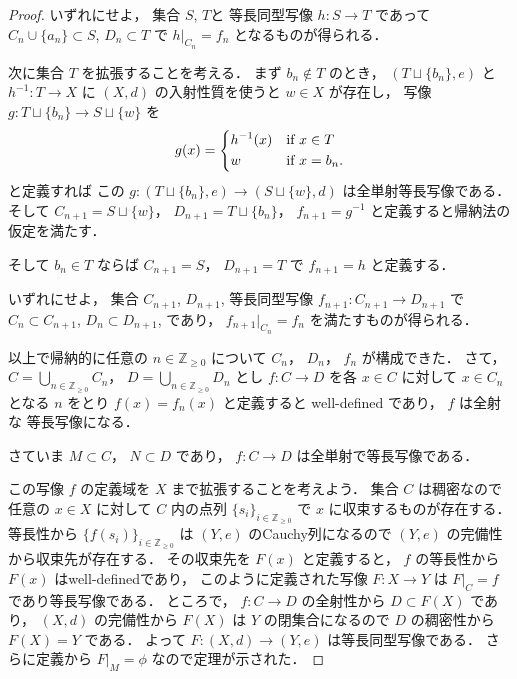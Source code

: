 \documentclass[leqno, 12pt]{jsarticle}
\newcommand{\zz}{\mathbb{Z}}
\newcommand{\yozz}[1]{\zz_{\ge #1}}
\newcommand{\restr}[2]{#1|_{#2}}
\begin{document}
\begin{proof}
いずれにせよ，
集合
$S$, 
$T$と
等長同型写像
$h\colon S\to T$
であって
$C_{n}\cup \{a_{n}\}\subset S$, 
$D_{n}\subset T$
で
$\restr{h}{C_{n}}=f_{n}$
となるものが得られる．



次に集合
$T$
を拡張することを考える．
まず
$b_{n}\not\in T$%
のとき，
$(T\sqcup\{b_{n}\}, e)$
と
$h^{-1}\colon  T\to X$%
に
$(X, d)$
の入射性質を使うと
$w\in X$
が存在し，
写像
$g\colon  T\sqcup\{b_{n}\}\to S\sqcup\{w\}$%
を
\[
g(x)=
\begin{dcases}
	h^{-1}(x) & \text{if
$x\in T$%
}\\
	w & \text{if
$x=b_{n}$%
}.
\end{dcases}
\]
と定義すれば
この
$g\colon  (T\sqcup \{b_{n}\}, e)\to (S\sqcup\{w\}, d)$
は全単射等長写像である．
そして
$C_{n+1}=S\sqcup \{w\}$，
$D_{n+1}=T\sqcup \{b_{n}\}$，
$f_{n+1}=g^{-1}$
と定義すると帰納法の仮定を満たす．


そして
$b_{n}\in T$
ならば
$C_{n+1}=S$，
 $D_{n+1}=T$
で%
$f_{n+1}=h$
と定義する．


いずれにせよ，
集合
$C_{n+1}$, 
$D_{n+1}$, 
等長同型写像
$f_{n+1}\colon C_{n+1}\to D_{n+1}$
で
$C_{n}\subset C_{n+1}$, 
$D_{n}\subset D_{n+1}$, 
であり，
$\restr{f_{n+1}}{C_{n}}=f_{n}$
を満たすものが得られる．




以上で帰納的に任意の
$n\in \yozz{0}$
について
$C_{n}$，
$D_{n}$，
$f_{n}$
が構成できた．
さて，
$C=\bigcup_{n\in \yozz{0}}C_{n}$，
$D=\bigcup_{n\in \yozz{0}}D_{n}$
とし
$f\colon  C\to  D$
を各
$x\in C$
に対して
$x\in C_{n}$
となる
$n$
をとり
$f(x)=f_{n}(x)$
と定義すると
well-defined
であり，
$f$
は全射な
等長写像になる．




さていま
$M\subset C$，
$N\subset D$
であり，
$f\colon  C\to D$
は全単射で等長写像である．




この写像
$f$
の定義域を
$X$
まで拡張することを考えよう．
集合
$C$
は稠密なので任意の
$x\in X$
に対して
$C$
内の点列
$\{s_{i}\}_{i\in \yozz{0}}$%
で
$x$
に収束するものが存在する．
等長性から
$\{f(s_{i})\}_{i\in \yozz{0}}$
は
$(Y, e)$
のCauchy列になるので
$(Y, e)$
の完備性から収束先が存在する．
その収束先を
$F(x)$
と定義すると，
$f$
の等長性から
$F(x)$
はwell-definedであり，
このように定義された写像
$F\colon  X\to Y$
は
$\restr{F}{C}=f$
であり等長写像である．
ところで，
$f\colon  C\to D$
の全射性から
$D\subset F(X)$
であり，
$(X, d)$
の完備性から
$F(X)$
は
$Y$
の閉集合になるので
$D$
の稠密性から
$F(X)=Y$
である．
よって
$F\colon (X, d)\to (Y, e)$
は等長同型写像である．
さらに定義から
$\restr{F}{M}=\phi$
なので定理が示された．
\end{proof}
\end{document}
